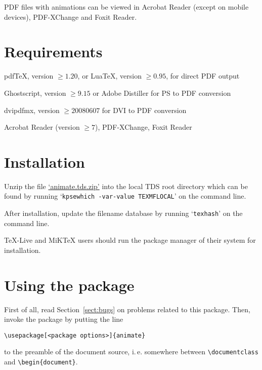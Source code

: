 \documentclass[a4paper]{article}
\begin{document}
PDF files with animations can be viewed in Acrobat Reader (except on mobile devices), PDF-XChange and Foxit Reader.

\section{Requirements}
\begin{trivlist}
\item pdf\TeX{}, version $\ge1.20$, or Lua\TeX{}, version $\ge0.95$, for direct PDF output
\item Ghostscript, version $\ge9.15$ or Adobe Distiller for PS to PDF conversion
\item dvipdfmx, version $\ge20080607$ for DVI to PDF conversion
\item Acrobat Reader (version $\ge7$), PDF-XChange, Foxit Reader
\end{trivlist}

\section{Installation}
Unzip the file \href{http://mirrors.ctan.org/install/macros/latex/contrib/animate.tds.zip}{`animate.tds.zip'} into the local TDS root directory which can be found by running `\verb+kpsewhich -var-value TEXMFLOCAL+' on the command line.

After installation, update the filename database by running `\verb+texhash+' on the command line.

\TeX-Live and MiK\TeX{} users should run the package manager of their system for installation.

\section{Using the package}
First of all, read Section~\ref{sect:bugs} on problems related to this package. Then, invoke the package by putting the line
\begin{verbatim}
\usepackage[<package options>]{animate}
\end{verbatim}
to the preamble of the document source, i.\,e. somewhere between \verb+\documentclass+ and \verb+\begin{document}+.
\end{document}
